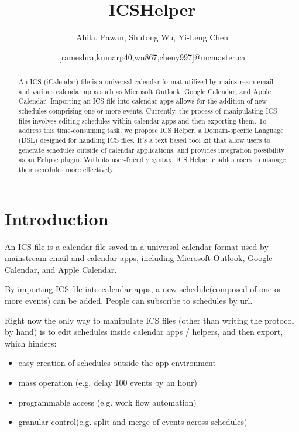 \documentclass[12pt, letterpaper, twoside]{article}
\title{\textbf{ICSHelper}} %
\author{Ahila, Pawan, Shutong Wu, Yi-Leng Chen \and [rameshra,kumarp40,wu867,cheny997]@mcmaster.ca} %
\begin{document}
\maketitle

\begin{abstract}
    An ICS (iCalendar) file is a universal calendar format utilized by mainstream email and various calendar apps such as Microsoft Outlook, Google Calendar, and Apple Calendar. Importing an ICS file into calendar apps allows for the addition of new schedules comprising one or more events. Currently, the process of manipulating ICS files involves editing schedules within calendar apps and then exporting them. To address this time-consuming task, we propose ICS Helper, a Domain-specific Language (DSL) designed for handling ICS files. It's a text based tool kit that allow users to generate schedules outside of calendar applications, and provides integration possibility as an Eclipse plugin. With its user-friendly syntax, ICS Helper enables users to manage their schedules more effectively. 
\end{abstract}

\vspace{2.5cm}


\thispagestyle{firstpage}

\pagebreak

\newgeometry{} %

\section{Introduction}
\label{sec:intro}
An ICS file is a calendar file saved in a universal calendar format used by mainstream email and calendar apps, including Microsoft Outlook, Google Calendar, and Apple Calendar. 

By importing ICS file into calendar apps, a new schedule(composed of one or more events) can be added. People can subscribe to schedules by url. 

Right now the only way to manipulate ICS files (other than writing the protocol by hand) is to edit schedules inside calendar apps / helpers, and then export, which hinders:

    \begin{itemize}
        \item easy creation of schedules outside the app environment
        \item mass operation (e.g. delay 100 events by an hour) 
        \item programmable access (e.g. work flow automation)
        \item granular control(e.g. split and merge of events across schedules)
    \end{itemize}
\end{document}
